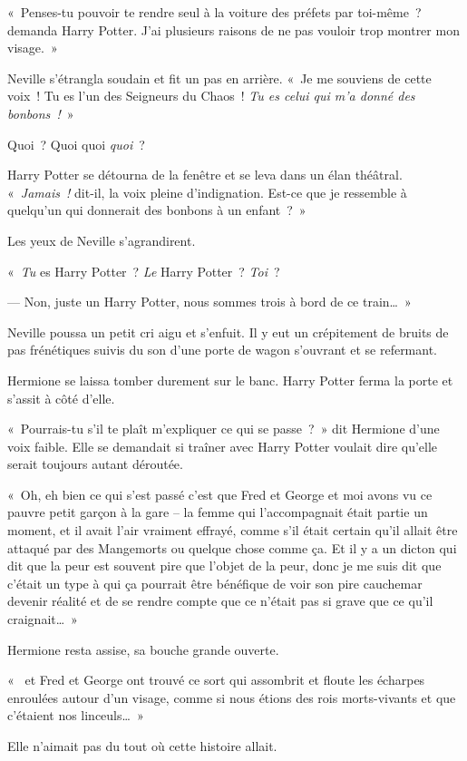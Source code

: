 «~Penses-tu pouvoir te rendre seul à la voiture des préfets par toi-même~? demanda Harry Potter. J'ai plusieurs raisons de ne pas vouloir trop montrer mon visage.~»

Neville s'étrangla soudain et fit un pas en arrière. «~Je me souviens de cette voix~! Tu es l'un des Seigneurs du Chaos~! \emph{Tu es celui qui m'a donné des bonbons~!}~»

Quoi~? Quoi quoi \emph{quoi}~?

Harry Potter se détourna de la fenêtre et se leva dans un élan théâtral. «~\emph{Jamais~!} dit-il, la voix pleine d'indignation. Est-ce que je ressemble à quelqu'un qui donnerait des bonbons à un enfant~?~»

Les yeux de Neville s'agrandirent.

«~\emph{Tu} es Harry Potter~? \emph{Le} Harry Potter~? \emph{Toi}~?

--- Non, juste un Harry Potter, nous sommes trois à bord de ce train…~»

Neville poussa un petit cri aigu et s'enfuit. Il y eut un crépitement de bruits de pas frénétiques suivis du son d'une porte de wagon s'ouvrant et se refermant.

Hermione se laissa tomber durement sur le banc. Harry Potter ferma la porte et s'assit à côté d'elle.

«~Pourrais-tu s'il te plaît m'expliquer ce qui se passe~?~» dit Hermione d'une voix faible. Elle se demandait si traîner avec Harry Potter voulait dire qu'elle serait toujours autant déroutée.

«~Oh, eh bien ce qui s'est passé c'est que Fred et George et moi avons vu ce pauvre petit garçon à la gare -- la femme qui l'accompagnait était partie un moment, et il avait l'air vraiment effrayé, comme s'il était certain qu'il allait être attaqué par des Mangemorts ou quelque chose comme ça. Et il y a un dicton qui dit que la peur est souvent pire que l'objet de la peur, donc je me suis dit que c'était un type à qui ça pourrait être bénéfique de voir son pire cauchemar devenir réalité et de se rendre compte que ce n'était pas si grave que ce qu'il craignait…~»

Hermione resta assise, sa bouche grande ouverte.

«~ et Fred et George ont trouvé ce sort qui assombrit et floute les écharpes enroulées autour d'un visage, comme si nous étions des rois morts-vivants et que c'étaient nos linceuls…~»

Elle n'aimait pas du tout où cette histoire allait.

